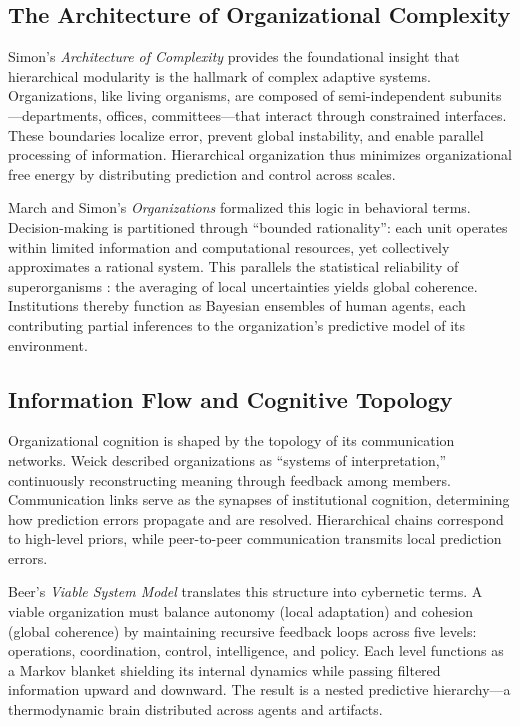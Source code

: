 \documentclass[11pt,a4paper]{article}
\begin{document}
\subsection{The Architecture of Organizational Complexity}

Simon’s \emph{Architecture of Complexity} \citep{Simon1962ArchitectureComplexity} provides the foundational insight that hierarchical modularity is the hallmark of complex adaptive systems.  Organizations, like living organisms, are composed of semi-independent subunits—departments, offices, committees—that interact through constrained interfaces.  These boundaries localize error, prevent global instability, and enable parallel processing of information.  Hierarchical organization thus minimizes organizational free energy by distributing prediction and control across scales.

March and Simon’s \emph{Organizations} \citep{MarchSimon1958Organizations} formalized this logic in behavioral terms.  Decision-making is partitioned through “bounded rationality”: each unit operates within limited information and computational resources, yet collectively approximates a rational system.  This parallels the statistical reliability of superorganisms \citep{Gordon2010AntEncounters, Seeley2010HoneybeeDemocracy}: the averaging of local uncertainties yields global coherence.  Institutions thereby function as Bayesian ensembles of human agents, each contributing partial inferences to the organization’s predictive model of its environment.

\subsection{Information Flow and Cognitive Topology}

Organizational cognition is shaped by the topology of its communication networks.  Weick \citep{Weick1979SocialPsychOrganization} described organizations as “systems of interpretation,” continuously reconstructing meaning through feedback among members.  Communication links serve as the synapses of institutional cognition, determining how prediction errors propagate and are resolved.  Hierarchical chains correspond to high-level priors, while peer-to-peer communication transmits local prediction errors.

Beer’s \emph{Viable System Model} \citep{Beer1979BrainOfFirm} translates this structure into cybernetic terms.  A viable organization must balance autonomy (local adaptation) and cohesion (global coherence) by maintaining recursive feedback loops across five levels: operations, coordination, control, intelligence, and policy.  Each level functions as a Markov blanket shielding its internal dynamics while passing filtered information upward and downward.  The result is a nested predictive hierarchy—a thermodynamic brain distributed across agents and artifacts.
\end{document}
